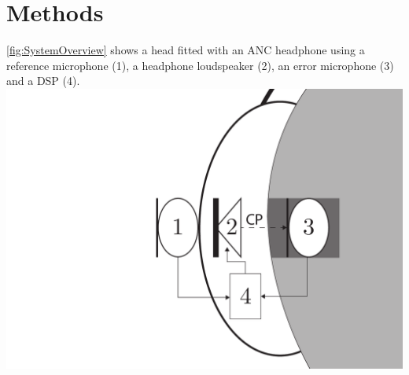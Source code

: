 \section*{Methods}
\autoref{fig:SystemOverview} shows a head fitted with an ANC headphone using a reference microphone (1), a headphone loudspeaker (2), an error microphone (3) and a DSP (4).
{
	\includegraphics[width=0.9\columnwidth]{figures/ArticleIllustrations/BasicOverviewZoomed}
	\label{fig:SystemOverview}
}




